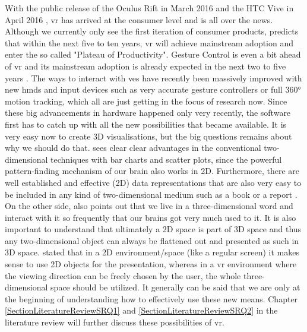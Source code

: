 With the public release of the Oculus Rift in March 2016 \citep{Oculus2016} and the HTC Vive in April 2016 \citep{Htcvive2016}, \gls{vr} has arrived at the consumer level and is all over the news. Although we currently only see the first iteration of consumer products, \cite{Gartner2015} predicts that within the next five to ten years, \gls{vr} will achieve mainstream adoption and enter the so called "Plateau of Productivity". Gesture Control is even a bit ahead of \gls{vr} and its mainstream adoption is already expected in the next two to five years \citep{Gartner2015}. The ways to interact with \glspl{ve} have recently been massively improved with new \glspl{hmd} and input devices such as very accurate gesture controllers or full 360° motion tracking, which all are just getting in the focus of research now. Since these big advancements in hardware happened only very recently, the software first has to catch up with all the new possibilities that became available. It is very easy now to create 3D visualisations, but the big questions remains about why we should do that. \cite{Ware2012} sees clear clear advantages in the conventional two-dimensional techniques with bar charts and scatter plots, since the powerful pattern-finding mechanism of our brain also works in 2D. Furthermore, there are well established and effective (2D) data representations that are also very easy to be included in any kind of two-dimensional medium such as a book or a report \citep{Ware2012}. On the other side, \cite{Ware2012} also points out that we live in a three-dimensional word and interact with it so frequently that our brains got very much used to it. It is also important to understand that ultimately a 2D space is part of 3D space and thus any two-dimensional object can always be flattened out and presented as such in 3D space. \cite{Kwon2015} stated that in a 2D environment/space (like a regular screen) it makes sense to use 2D objects for the presentation, whereas in a \gls{vr} environment where the viewing direction can be freely chosen by the user, the whole three-dimensional space should be utilized. It generally can be said that we are only at the beginning of understanding how to effectively use these new means. Chapter \ref{SectionLiteratureReviewSRQ1} and \ref{SectionLiteratureReviewSRQ2} in the literature review will further discuss these possibilities of \gls{vr}.

